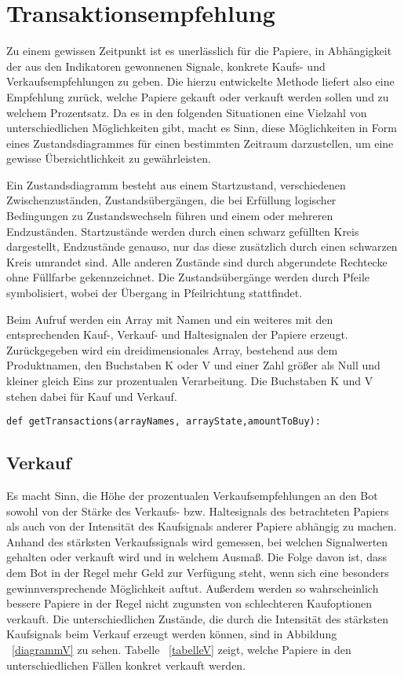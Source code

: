\section{Transaktionsempfehlung}

Zu einem gewissen Zeitpunkt ist es unerlässlich für die Papiere, in Abhängigkeit der aus den Indikatoren gewonnenen Signale, konkrete Kaufs- und Verkaufsempfehlungen zu geben. Die hierzu entwickelte Methode liefert also eine Empfehlung zurück, welche Papiere gekauft oder verkauft werden sollen und zu welchem Prozentsatz. Da es in den folgenden Situationen eine Vielzahl von unterschiedlichen Möglichkeiten gibt, macht es Sinn, diese Möglichkeiten in Form eines Zustandsdiagrammes für einen bestimmten Zeitraum darzustellen, um eine gewisse Übersichtlichkeit zu gewährleisten.\cite{ZDiagramm}

Ein Zustandsdiagramm besteht aus einem Startzustand, verschiedenen Zwischenzuständen, Zustandsübergängen, die bei Erfüllung logischer Bedingungen zu Zustandswechseln führen und einem oder mehreren Endzuständen. Startzustände werden durch einen schwarz gefüllten Kreis dargestellt, Endzustände genauso, nur das diese zusätzlich durch einen schwarzen Kreis umrandet sind. Alle anderen Zustände sind durch abgerundete Rechtecke ohne Füllfarbe gekennzeichnet. Die Zustandsübergänge werden durch Pfeile symbolisiert, wobei der Übergang in Pfeilrichtung stattfindet.\cite{ZDiagramm}

Beim Aufruf werden ein Array mit Namen und  ein weiteres mit den entsprechenden Kauf-, Verkauf- und Haltesignalen der Papiere erzeugt. Zurückgegeben wird ein dreidimensionales Array, bestehend aus dem Produktnamen, den Buchstaben K oder V und einer Zahl größer als Null und kleiner gleich Eins zur prozentualen Verarbeitung. Die Buchstaben K und V stehen dabei für Kauf und Verkauf.             
\begin{lstlisting}[breakatwhitespace=false, breaklines=true]
def getTransactions(arrayNames, arrayState,amountToBuy):
\end{lstlisting}
\subsection{Verkauf}
Es macht Sinn, die Höhe der prozentualen Verkaufsempfehlungen an den Bot sowohl von der Stärke des Verkaufs- bzw. Haltesignals des betrachteten Papiers als auch von der Intensität des Kaufsignals anderer Papiere abhängig zu machen. Anhand des stärksten Verkaufssignals wird gemessen, bei welchen Signalwerten gehalten oder verkauft wird und in welchem Ausmaß. Die Folge davon ist, dass dem Bot in der Regel mehr Geld zur Verfügung steht, wenn sich eine besonders gewinnversprechende Möglichkeit auftut. Außerdem werden so wahrscheinlich bessere Papiere in der Regel nicht zugunsten von schlechteren Kaufoptionen verkauft. Die unterschiedlichen Zustände, die durch die Intensität des stärksten Kaufsignals beim Verkauf erzeugt werden können, sind in Abbildung ~\ref{diagrammV} zu sehen. Tabelle ~\ref{tabelleV} zeigt, welche Papiere in den unterschiedlichen Fällen konkret verkauft werden.

